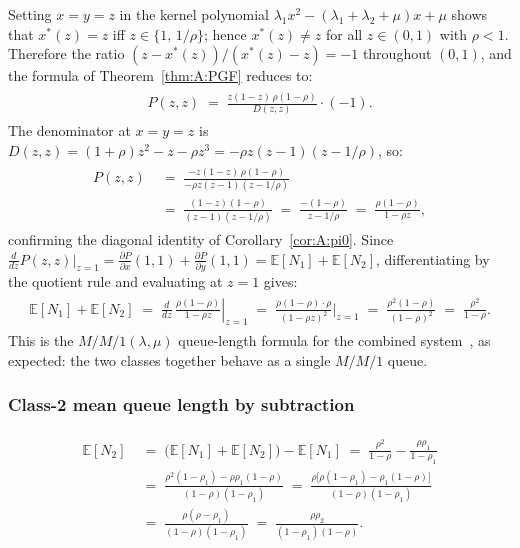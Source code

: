 Setting $x=y=z$ in the kernel polynomial $\lambda_1 x^2-(\lambda_1+\lambda_2+\mu)x+\mu$
shows that $x^*(z)=z$ iff $z\in\{1,\,1/\rho\}$; hence $x^*(z)\neq z$ for all
$z\in(0,1)$ with $\rho<1$. Therefore the ratio
$(z-x^*(z))/(x^*(z)-z)=-1$ throughout $(0,1)$, and the formula of
Theorem~\ref{thm:A:PGF} reduces to:
\begin{align}
    \begin{split}
        P(z,z)
        \;=\; \frac{z(1-z)\,\rho(1-\rho)}{D(z,z)}\cdot(-1).
    \end{split}
\end{align}
The denominator at $x=y=z$ is
$D(z,z)=(1+\rho)z^2-z-\rho z^3=-\rho z(z-1)(z-1/\rho)$,
so:
\begin{align}
    \begin{split}
        P(z,z)
        &\;=\; \frac{-z(1-z)\,\rho(1-\rho)}{-\rho z(z-1)(z-1/\rho)} \\
        &\;=\; \frac{(1-z)(1-\rho)}{(z-1)(z-1/\rho)}
         \;=\; \frac{-(1-\rho)}{z-1/\rho}
         \;=\; \frac{\rho(1-\rho)}{1-\rho z},
    \end{split}
    \label{eq:A:Pzz}
\end{align}
confirming the diagonal identity of Corollary~\ref{cor:A:pi0}.
Since $\tfrac{d}{dz}P(z,z)\big|_{z=1}
=\tfrac{\partial P}{\partial x}(1,1)+\tfrac{\partial P}{\partial y}(1,1)
=\mathbb{E}[N_1]+\mathbb{E}[N_2]$, differentiating by the quotient rule and
evaluating at $z=1$ gives:
\begin{align}
    \begin{split}
        \mathbb{E}[N_1]+\mathbb{E}[N_2]
        \;=\; \left.\frac{d}{dz}\,\frac{\rho(1-\rho)}{1-\rho z}\right|_{z=1}
        \;=\; \frac{\rho(1-\rho)\cdot\rho}{(1-\rho z)^2}\bigg|_{z=1}
        \;=\; \frac{\rho^2(1-\rho)}{(1-\rho)^2}
        \;=\; \frac{\rho^2}{1-\rho}.
    \end{split}
    \label{eq:A:EN}
\end{align}
This is the $M/M/1(\lambda,\mu)$ queue-length formula for the combined
system~\cite{adan2002queueing}, as expected: the two classes together behave as a
single $M/M/1$ queue.

\subsubsection{Class-2 mean queue length by subtraction}

\begin{align}
    \begin{split}
        \mathbb{E}[N_2]
        &\;=\; \bigl(\mathbb{E}[N_1]+\mathbb{E}[N_2]\bigr)-\mathbb{E}[N_1]
        \;=\; \frac{\rho^2}{1-\rho} - \frac{\rho\rho_1}{1-\rho_1} \\[4pt]
        &\;=\; \frac{\rho^2(1-\rho_1)-\rho\rho_1(1-\rho)}{(1-\rho)(1-\rho_1)}
        \;=\; \frac{\rho\bigl[\rho(1-\rho_1)-\rho_1(1-\rho)\bigr]}{(1-\rho)(1-\rho_1)} \\[4pt]
        &\;=\; \frac{\rho(\rho-\rho_1)}{(1-\rho)(1-\rho_1)}
        \;=\; \frac{\rho\rho_2}{(1-\rho_1)(1-\rho)}.
    \end{split}
    \label{eq:A:EN2}
\end{align}

